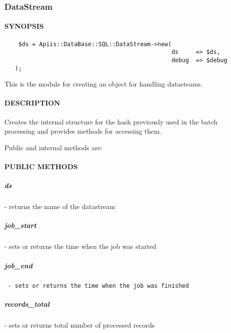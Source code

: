 \subsubsection{DataStream\label{DataStream}}




\paragraph*{SYNOPSIS\label{DataStream_SYNOPSIS}}
\begin{verbatim}
    $ds = Apiis::DataBase::SQL::DataStream->new(
                                                ds     => $ds,
                                                debug  => $debug
   );
\end{verbatim}


This is the module for creating an object for handling datasteams.

\paragraph*{DESCRIPTION\label{DataStream_DESCRIPTION}}


Creates the internal structure for the hash previously used in the batch processing and provides methods for accessing them.



Public and internal methods are:

\paragraph*{PUBLIC METHODS\label{DataStream_PUBLIC_METHODS}}
\subparagraph*{ds\label{DataStream_ds}}


- returns the name of the datastream

\subparagraph*{job\_start\label{DataStream_job_start}}


- sets or returns the time when the job was started

\subparagraph*{job\_end\label{DataStream_job_end}}
\begin{verbatim}
 - sets or returns the time when the job was finished
\end{verbatim}
\subparagraph*{records\_total\label{DataStream_records_total}}


- sets or returns total number of processed records

